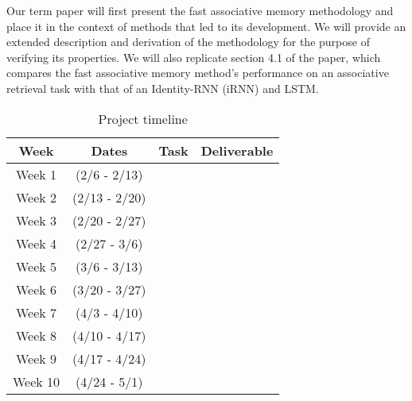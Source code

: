 Our term paper will first present the fast associative memory methodology and place it in the context of methods that led to its development. We will provide an extended description and derivation of the methodology for the purpose of verifying its properties. We will also replicate section 4.1 of the paper, which compares the fast associative memory method's performance on an associative retrieval task with that of an Identity-RNN (iRNN) and LSTM.


\begin{table}
  \caption{Project timeline}
  \label{tab:freq}
  \begin{tabular}{cccl}
    \toprule
    Week & Dates & Task & Deliverable\\
    \midrule
    Week 1 & (2/6   - 2/13) & & \\
    Week 2 & (2/13  - 2/20) & & \\
    Week 3 & (2/20  - 2/27) & & \\
    Week 4 & (2/27  - 3/6) & & \\
    Week 5 & (3/6   - 3/13) & & \\
    Week 6 & (3/20  - 3/27) & & \\
    Week 7 & (4/3   - 4/10) & & \\
    Week 8 & (4/10  - 4/17) & & \\
    Week 9 & (4/17  - 4/24) & & \\
    Week 10 & (4/24 - 5/1) & & \\
  \bottomrule
\end{tabular}
\end{table}
